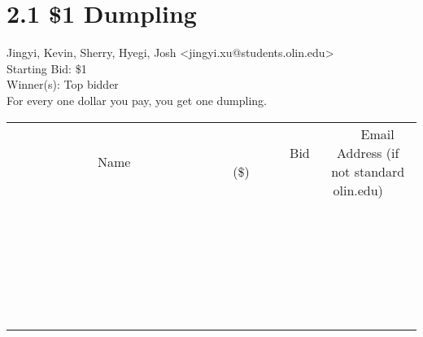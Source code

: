 \documentclass[11pt]{article}
\begin{document}
					\section*{2.1 \$1 Dumpling}
					Jingyi, Kevin, Sherry, Hyegi, Josh <jingyi.xu@students.olin.edu> \\
					Starting Bid: \$1 \\
					Winner(s): Top bidder \\
					For every one dollar you pay, you get one dumpling. \\
					[6ex]
					\begin{tabular}{c c c}
						~~~~~~~~~~~~~Name~~~~~~~~~~~~~ & ~~~~~~~~~Bid (\$)~~~~~~~~~ & ~~~Email Address (if not standard olin.edu)~~~ \\
				
 & & \\
\hline
 & & \\
\hline
 & & \\
\hline
 & & \\
\hline
 & & \\
\hline
 & & \\
\hline
 & & \\
\hline
 & & \\
\hline
 & & \\
\hline
 & & \\
\hline
 & & \\
\hline
 & & \\
\hline
 & & \\
\hline
 & & \\
\hline
 & & \\
\hline
 & & \\
\hline
 & & \\
\hline
 & & \\
\hline
 & & \\
\hline
 & & \\
\hline
 & & \\
\hline
 & & \\
\hline
 & & \\
\hline
 & & \\
\hline
 & & \\
\hline
 & & \\
\hline
					\end{tabular}
					\clearpage
				
\end{document}
